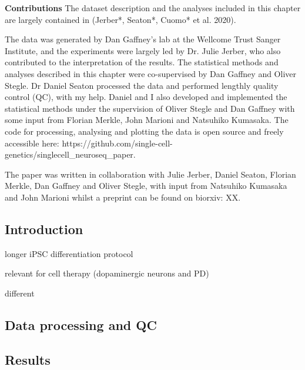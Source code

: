 \begin{Abstract}

\hspace{-3mm}\textbf{Contributions} The dataset description and the analyses included in this chapter are largely contained in (Jerber*, Seaton*, Cuomo* et al. 2020).

\vspace{5mm}

The data was generated by Dan Gaffney’s lab at the Wellcome Trust Sanger Institute, and the experiments were largely led by Dr. Julie Jerber, who also contributed to the interpretation of the results. 
The statistical methods and analyses described in this chapter were co-supervised by Dan Gaffney and Oliver Stegle. 
Dr Daniel Seaton processed the data and performed lengthly quality control (QC), with my help. 
Daniel and I also developed and implemented the statistical methods under the supervision of Oliver Stegle and Dan Gaffney with some input from Florian Merkle, John Marioni and Natsuhiko Kumasaka.
The code for processing, analysing and plotting the data is open source and freely accessible here: https://github.com/single-cell-genetics/singlecell\_neuroseq\_paper.

\vspace{5mm}

The paper was written in collaboration with Julie Jerber, Daniel Seaton, Florian Merkle, Dan Gaffney and Oliver Stegle, with input from Natsuhiko Kumasaka and John Marioni whilst a preprint can be found on biorxiv: XX.

\end{Abstract}

\subsection{Introduction}

longer iPSC differentiation protocol

relevant for cell therapy (dopaminergic neurons and PD)

different 

\subsection{Data processing and QC}

\subsection{Results}

